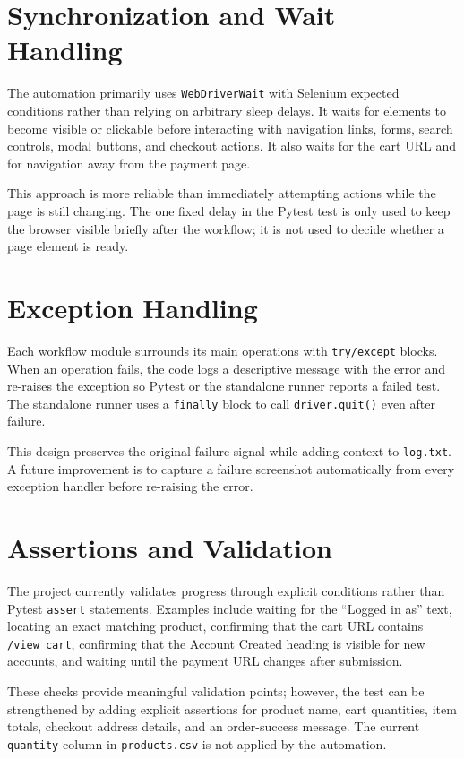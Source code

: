 \documentclass[12pt,a4paper]{article}
\begin{document}
\section{Synchronization and Wait Handling}
The automation primarily uses \texttt{WebDriverWait} with Selenium expected conditions rather than relying on arbitrary sleep delays. It waits for elements to become visible or clickable before interacting with navigation links, forms, search controls, modal buttons, and checkout actions. It also waits for the cart URL and for navigation away from the payment page.

This approach is more reliable than immediately attempting actions while the page is still changing. The one fixed delay in the Pytest test is only used to keep the browser visible briefly after the workflow; it is not used to decide whether a page element is ready.

\section{Exception Handling}
Each workflow module surrounds its main operations with \texttt{try/except} blocks. When an operation fails, the code logs a descriptive message with the error and re-raises the exception so Pytest or the standalone runner reports a failed test. The standalone runner uses a \texttt{finally} block to call \texttt{driver.quit()} even after failure.

This design preserves the original failure signal while adding context to \texttt{log.txt}. A future improvement is to capture a failure screenshot automatically from every exception handler before re-raising the error.

\section{Assertions and Validation}
The project currently validates progress through explicit conditions rather than Pytest \texttt{assert} statements. Examples include waiting for the ``Logged in as'' text, locating an exact matching product, confirming that the cart URL contains \texttt{/view\_cart}, confirming that the Account Created heading is visible for new accounts, and waiting until the payment URL changes after submission.

These checks provide meaningful validation points; however, the test can be strengthened by adding explicit assertions for product name, cart quantities, item totals, checkout address details, and an order-success message. The current \texttt{quantity} column in \texttt{products.csv} is not applied by the automation.
\end{document}
